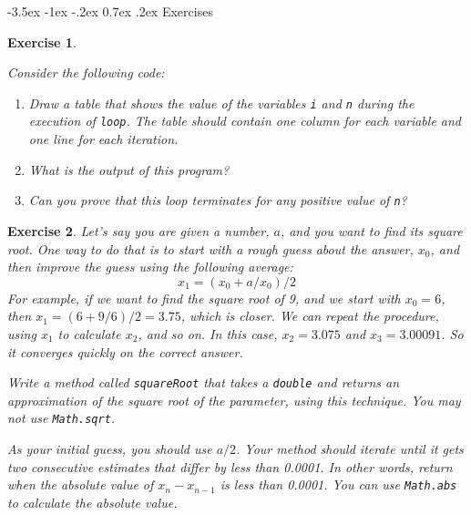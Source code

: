 \documentclass[12pt]{book}
\makeatletter
\theoremstyle{exercise}
\newtheorem{exercise}{Exercise}[chapter]
\newcommand{\java}[1]{\verb"#1"}
\renewcommand{\section}{\@startsection{section}{1}{\z@}%
    {-3.5ex \@plus -1ex \@minus -.2ex}%
    {0.7ex \@plus.2ex}%
    {\normalfont\Large\bfseries}}
\newcommand{\java}[1]{\lstinline{#1}} %
\makeatother
\begin{document}
\section{Exercises}


\begin{exercise}
\label{infloop}

Consider the following code:


\begin{enumerate}

\item Draw a table that shows the value of the variables \java{i} and \java{n} during the execution of \java{loop}.
The table should contain one column for each variable and one line for each iteration.

\item What is the output of this program?

\item Can you prove that this loop terminates for any positive value of \java{n}?

\end{enumerate}

\end{exercise}


\begin{exercise}

Let's say you are given a number, $a$, and you want to find its square root.
One way to do that is to start with a rough guess about the answer, $x_0$, and then improve the guess using the following average:
%
\[ x_1 =(x_0 + a/x_0) / 2 \]
%
For example, if we want to find the square root of 9, and we start with $x_0 = 6$, then $x_1 = (6 + 9/6) / 2 = 3.75$, which is closer.
We can repeat the procedure, using $x_1$ to calculate $x_2$, and so on.
In this case, $x_2 = 3.075$ and $x_3 = 3.00091$.
So it converges quickly on the correct answer.

Write a method called \java{squareRoot} that takes a \java{double} and returns an approximation of the square root of the parameter, using this technique.
You may not use \java{Math.sqrt}.

As your initial guess, you should use $a/2$.
Your method should iterate until it gets two consecutive estimates that differ by less than 0.0001.
In other words, return when the absolute value of $x_n - x_{n-1}$ is less than 0.0001.
You can use \java{Math.abs} to calculate the absolute value.

\end{exercise}
\end{document}
